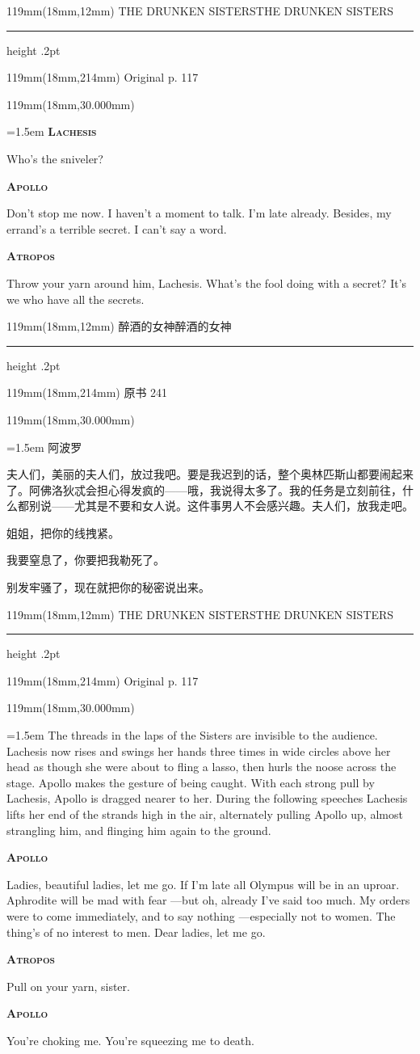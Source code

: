 \documentclass{article}
\newcommand{\ENsetup}{\normalfont\color{ink}\fontsize{11}{16.5}\selectfont\emergencystretch=1.5em}
\newcommand{\ZHsetup}{\normalfont\color{ink}\fontsize{10.5}{17}\selectfont\emergencystretch=1.5em}
\newcommand{\ENspeaker}[1]{{\fontsize{9.8}{13}\selectfont\scshape\bfseries #1}\par\vspace{3pt}}
\newcommand{\ZHspeaker}[1]{{\hei\fontsize{10.3}{13}\selectfont #1}\par\vspace{3pt}}
\newcommand{\Block}[3]{\begin{textblock*}{119mm}(18mm,#1mm){#2 #3\par}\end{textblock*}}
\newcommand{\Heading}[3]{%
  \begin{textblock*}{119mm}(18mm,12mm)
    \color{quiet}\fontsize{7.5}{10}\selectfont
    #1\hfill #2\par\vspace{3mm}\hrule height .2pt
  \end{textblock*}
  \begin{textblock*}{119mm}(18mm,214mm)
    \color{quiet}\fontsize{7}{10}\selectfont #3\hfill\thepage
  \end{textblock*}
}
\begin{document}
\newpage
\null
\Heading{THE DRUNKEN SISTERS}{THE DRUNKEN SISTERS}{Original p. 117}
\Block{30.000}{\ENsetup}{\sloppy
\ENspeaker{Lachesis}
Who's the sniveler?\par\vspace{2pt}
\ENspeaker{Apollo}
Don't stop me now. I haven't a moment to talk. I'm late already. Besides, my errand's a terrible secret. I can't say a word.\par\vspace{2pt}
\ENspeaker{Atropos}
Throw your yarn around him, Lachesis. What's the fool doing with a secret? It's we who have all the secrets.\par\vspace{2pt}}
\newpage
\null
\Heading{醉酒的女神}{醉酒的女神}{原书 241}
\Block{30.000}{\ZHsetup}{\ZHspeaker{阿波罗}夫人们，美丽的夫人们，放过我吧。要是我迟到的话，整个奥林匹斯山都要闹起来了。阿佛洛狄忒会担心得发疯的——哦，我说得太多了。我的任务是立刻前往，什么都别说——尤其是不要和女人说。这件事男人不会感兴趣。夫人们，放我走吧。\par \vspace{2.2mm}\ZHspeaker{阿特洛波斯}姐姐，把你的线拽紧。\par \vspace{2.2mm}\ZHspeaker{阿波罗}我要窒息了，你要把我勒死了。\par \vspace{2.2mm}\ZHspeaker{拉刻西斯}{\kai （强迫他）}别发牢骚了，现在就把你的秘密说出来。\par }
\newpage
\null
\Heading{THE DRUNKEN SISTERS}{THE DRUNKEN SISTERS}{Original p. 117}
\Block{30.000}{\ENsetup}{\sloppy
The threads in the laps of the Sisters are invisible to the audience. Lachesis now rises and swings her hands three times in wide circles above her head as though she were about to fling a lasso, then hurls the noose across the stage. Apollo makes the gesture of being caught. With each strong pull by Lachesis, Apollo is dragged nearer to her. During the following speeches Lachesis lifts her end of the strands high in the air, alternately pulling Apollo up, almost strangling him, and flinging him again to the ground.\par\vspace{2pt}
\ENspeaker{Apollo}
Ladies, beautiful ladies, let me go. If I'm late all Olympus will be in an uproar. Aphrodite will be mad with fear —but oh, already I've said too much. My orders were to come immediately, and to say nothing —especially not to women. The thing's of no interest to men. Dear ladies, let me go.\par\vspace{2pt}
\ENspeaker{Atropos}
Pull on your yarn, sister.\par\vspace{2pt}
\ENspeaker{Apollo}
You're choking me. You're squeezing me to death.\par\vspace{2pt}}
\end{document}
